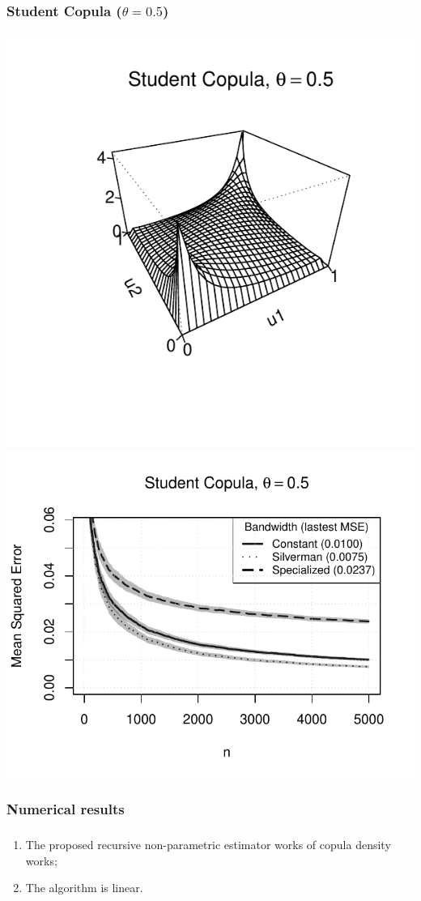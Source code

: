 \documentclass[aspectratio=169]{beamer}
\begin{document}
		\subsubsection{Student Copula ($ \theta = 0.5 $)}
			\begin{frame}
				\frametitle{\insertsubsubsection}
				
				\begin{flushleft}
					\includegraphics[width=0.4\linewidth]{plots/numerical_results/student05}
					\includegraphics[width=0.5\linewidth]{../text/plots/experiment_results/student05}
				\end{flushleft}
				
			\end{frame}
			
		\subsubsection{Numerical results}
			\begin{frame}
				\frametitle{\insertsubsubsection}
				
				\begin{enumerate}
					\item The proposed recursive non-parametric estimator works of copula density works;
					\item The algorithm is linear.
				\end{enumerate}
				
			\end{frame}	
	
\end{document}
